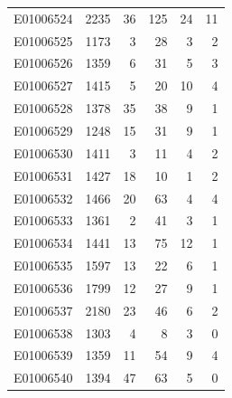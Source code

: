 \documentclass[
  letterpaper,
  DIV=11,
  numbers=noendperiod]{scrreprt}
\begin{document}
\begin{tabular}{lrrrrr}
E01006524     &    2235 &      36 &                   125 &                              24 &                      11 \\
E01006525     &    1173 &       3 &                    28 &                               3 &                       2 \\
E01006526     &    1359 &       6 &                    31 &                               5 &                       3 \\
E01006527     &    1415 &       5 &                    20 &                              10 &                       4 \\
E01006528     &    1378 &      35 &                    38 &                               9 &                       1 \\
E01006529     &    1248 &      15 &                    31 &                               9 &                       1 \\
E01006530     &    1411 &       3 &                    11 &                               4 &                       2 \\
E01006531     &    1427 &      18 &                    10 &                               1 &                       2 \\
E01006532     &    1466 &      20 &                    63 &                               4 &                       4 \\
E01006533     &    1361 &       2 &                    41 &                               3 &                       1 \\
E01006534     &    1441 &      13 &                    75 &                              12 &                       1 \\
E01006535     &    1597 &      13 &                    22 &                               6 &                       1 \\
E01006536     &    1799 &      12 &                    27 &                               9 &                       1 \\
E01006537     &    2180 &      23 &                    46 &                               6 &                       2 \\
E01006538     &    1303 &       4 &                     8 &                               3 &                       0 \\
E01006539     &    1359 &      11 &                    54 &                               9 &                       4 \\
E01006540     &    1394 &      47 &                    63 &                               5 &                       0 \\

\end{tabular}
\end{document}
